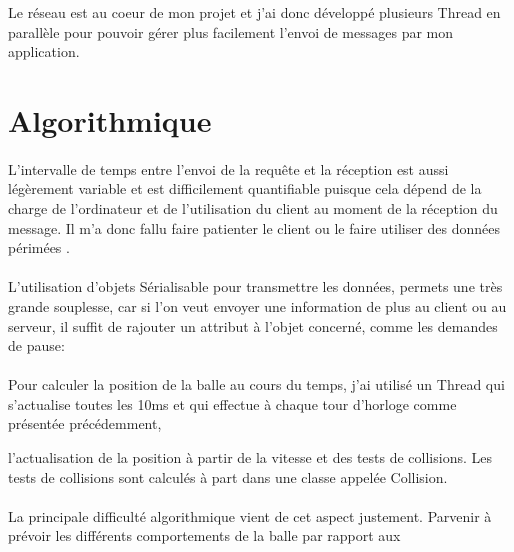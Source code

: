 \documentclass[a4paper,12pt]{report}
\begin{document}
Le réseau est au coeur de mon projet et j'ai donc développé plusieurs Thread en parallèle pour pouvoir gérer plus facilement l'envoi de messages par mon application.


\section{Algorithmique}

\paragraph{}

L'intervalle de temps entre l'envoi de la requête et la réception est aussi légèrement variable et est difficilement quantifiable puisque cela dépend de la charge de l'ordinateur et de l'utilisation du client au moment de la réception du message. Il m'a donc fallu faire patienter le client ou le faire utiliser des données \og périmées \fg.

\paragraph{}

L'utilisation d'objets Sérialisable pour transmettre les données, permets une très grande souplesse, car si l'on veut envoyer une information de plus au client ou au serveur, il suffit de rajouter un attribut à l'objet concerné, comme les demandes de pause:



\paragraph{}

Pour calculer la position de la balle au cours du temps, j'ai utilisé un Thread qui s'actualise toutes les 10ms et qui effectue à chaque tour d'horloge comme présentée précédemment,

l'actualisation de la position à partir de la vitesse et des tests de collisions. Les tests de collisions sont calculés à part dans une classe appelée Collision.

\paragraph{}

La principale difficulté algorithmique vient de cet aspect justement. Parvenir à prévoir les différents comportements de la balle par rapport aux
\end{document}
